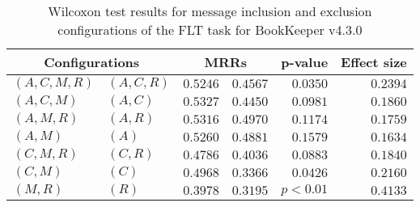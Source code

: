 
\begin{table}
\begin{spacing}{1.2}
\centering
\caption{Wilcoxon test results for message inclusion and exclusion configurations of the FLT task for BookKeeper v4.3.0}
\label{table:versus-wilcox-bookkeeper-flt-message}
\begin{tabular}{ll|rr|rr}
\toprule
      \multicolumn{2}{c|}{Configurations} &          \multicolumn{2}{c|}{MRRs} &       p-value & Effect size \\
\midrule
 $(A,C,M,R)$ &  $(A,C,R)$ & $0.5246$ & $0.4567$ & $0.0350$ &    $0.2394$ \\
   $(A,C,M)$ &    $(A,C)$ & $0.5327$ & $0.4450$ & $0.0981$ &    $0.1860$ \\
   $(A,M,R)$ &    $(A,R)$ & $0.5316$ & $0.4970$ & $0.1174$ &    $0.1759$ \\
     $(A,M)$ &      $(A)$ & $0.5260$ & $0.4881$ & $0.1579$ &    $0.1634$ \\
   $(C,M,R)$ &    $(C,R)$ & $0.4786$ & $0.4036$ & $0.0883$ &    $0.1840$ \\
     $(C,M)$ &      $(C)$ & $0.4968$ & $0.3366$ & $0.0426$ &    $0.2160$ \\
     $(M,R)$ &      $(R)$ & $0.3978$ & $0.3195$ & $p<0.01$ &    $0.4133$ \\
\bottomrule
\end{tabular}

\end{spacing}
\end{table}

